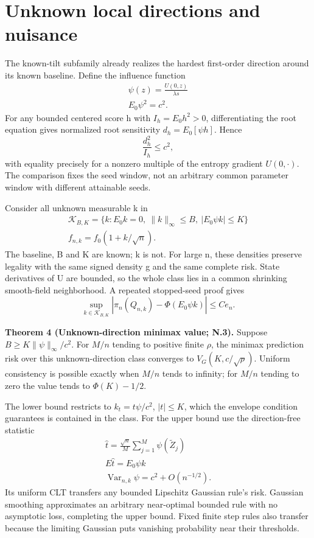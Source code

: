 \section{Unknown local directions and nuisance}\label{unknown-local-directions-and-nuisance}

The known-tilt subfamily already realizes the hardest first-order direction around its known baseline. Define the influence function
\[
\begin{gathered}
\psi(z)=\frac{U(0,z)}{\lambda s} \\
E_0\psi^2=c^2.
\end{gathered}
\]
For any bounded centered score h with \(I_h=E_0h^2>0\), differentiating the root equation gives normalized root sensitivity \(d_h=E_0[\psi h]\). Hence
\[
\frac{d_h^2}{I_h}\le c^2,
\]
with equality precisely for a nonzero multiple of the entropy gradient \(U(0,\cdot)\). The comparison fixes the seed window, not an arbitrary common parameter window with different attainable seeds.

Consider all unknown measurable k in
\[
\begin{gathered}
\mathcal K_{B,K}=\{k:E_0k=0,\ \|k\|_\infty\le B,\ |E_0\psi k|\le K\} \\
f_{n,k}=f_0(1+k/\sqrt n).
\end{gathered}
\]
The baseline, B and K are known; k is not. For large n, these densities preserve legality with the same signed density g and the same complete risk. State derivatives of U are bounded, so the whole class lies in a common shrinking smooth-field neighborhood. A repeated stopped-seed proof gives
\[
\sup_{k\in\mathcal K_{B,K}}|\pi_n(Q_{n,k})-\Phi(E_0\psi k)|\le Ce_n.
\]

\textbf{Theorem 4 (Unknown-direction minimax value; N.3).} Suppose \(B\ge K\|\psi\|_\infty/c^2\). For \(M/n\) tending to positive finite \(\rho\), the minimax prediction risk over this unknown-direction class converges to \(V_G(K,c/\sqrt\rho)\). Uniform consistency is possible exactly when \(M/n\) tends to infinity; for \(M/n\) tending to zero the value tends to \(\Phi(K)-1/2\).

The lower bound restricts to \(k_t=t\psi/c^2\), \(|t|\le K\), which the envelope condition guarantees is contained in the class. For the upper bound use the direction-free statistic
\[
\begin{gathered}
\widehat t=\frac{\sqrt n}{M}\sum_{j=1}^M\psi(\widetilde Z_j) \\
E\widehat t=E_0\psi k \\
\operatorname{Var}_{n,k}\psi=c^2+O(n^{-1/2}).
\end{gathered}
\]
Its uniform CLT transfers any bounded Lipschitz Gaussian rule's risk. Gaussian smoothing approximates an arbitrary near-optimal bounded rule with no asymptotic loss, completing the upper bound. Fixed finite step rules also transfer because the limiting Gaussian puts vanishing probability near their thresholds.

